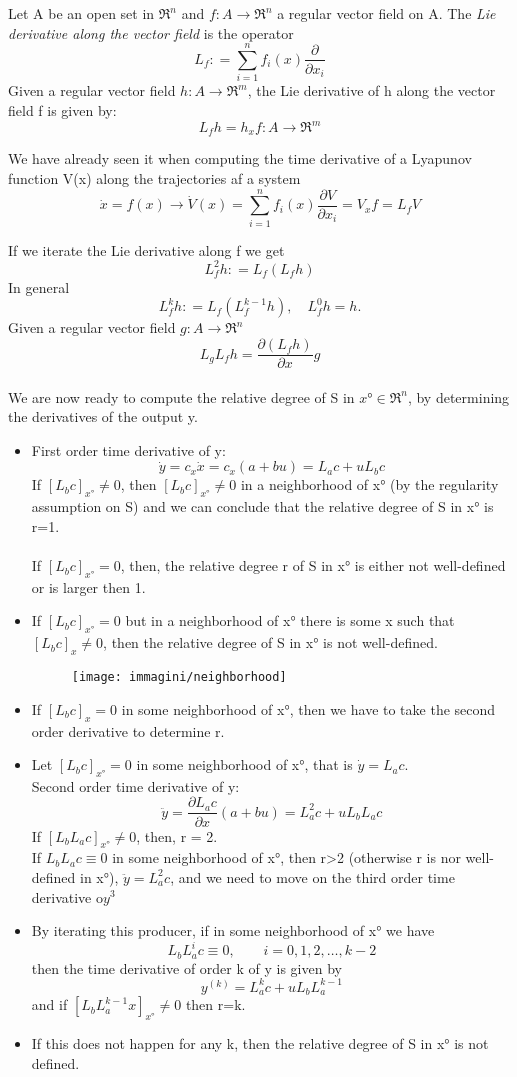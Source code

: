 \begin{defn}
	Let A be an open set in $\Re^n$ and $f\colon A \to \Re^n$ a regular vector field on A. The \emph{Lie derivative along the vector field} is the operator 
	\[
	L_f\colon=\sum_{i=1}^{n}f_i(x)\frac{\partial}{\partial x_i}
	\]
Given a regular vector field $h\colon A\to 	\Re^m$, the Lie derivative of h along the vector field f is given by: \[
\boxed{L_fh=h_xf\colon A\to \Re^m}
\]
\end{defn}
\begin{remark}
	We have already seen it when computing the time derivative of a Lyapunov function V(x) along the trajectories af a system
	\[\dot{x}=f(x)\to\dot{V}(x)=\sum_{i=1}^{n}f_i(x)\frac{\partial V}{\partial x_i}=V_xf=L_fV\]
\end{remark}
If we iterate the Lie derivative along f we get \[L_f^2h\colon=L_f(L_fh)\] In general \[L_f^kh\colon=L_f(L_f^{k-1}h),\quad L_f^0h=h.\]
Given a regular vector field $g\colon A\to \Re^n$ 
\[
L_gL_fh=\frac{\partial (L_fh)}{\partial x}g
\]
\\
We are now ready to compute the relative degree of S in $x°\in \Re^n$, by determining the derivatives of the output y.
\begin{itemize}
	\item First order time derivative of y: \[\dot{y}=c_x\dot{x}=c_x(a+bu)=L_ac+uL_bc\] If $[L_bc]_{x°}\neq 0$, then $[L_bc]_{x°}\neq 0$ in a neighborhood of x° (by the regularity assumption on S) and we can conclude that the relative degree of S in x° is r=1.\\
	\\
	If $[L_bc]_{x°}=0$, then, the relative degree r of S in x° is either not well-defined or is larger then 1.
	\item If $[L_bc]_{x°}=0$ but in a neighborhood of x° there is some x such that $[L_bc]_{x}\neq 0$, then the relative degree of S in x° is not well-defined.
	\begin{figure}[H]
		\centering
		\texttt{[image: immagini/neighborhood]}
		\label{fig:neighborhood}
	\end{figure}
	\item If $[L_bc]_x=0$ in some neighborhood of x°, then we have to take the second order derivative to determine r.
	\item Let $[L_bc]_{x°}=0$ in some neighborhood of x°, that is $\dot{y}=L_ac$.\\Second order time derivative of y: \[\ddot{y}=\frac{\partial L_ac}{\partial x}(a+bu)=L_a^2c+uL_bL_ac\]
	If $[L_bL_ac]_{x°}\neq 0$, then, r = 2.\\
	If $L_bL_ac \equiv 0 $ in some neighborhood of x°, then r>2 (otherwise r is nor well-defined in x°), $\ddot{y}=L_a^2c$, and we need to move on the third order time derivative o$y^{3}$
	\item By iterating this producer, if in some neighborhood of x° we have \[L_bL_a^ic\equiv0,\qquad i=0,1,2,\dots,k-2\] then the time derivative of order k of y is given by \[y^{(k)}=L_a^kc+uL_bL_a^{k-1}\] and if $[L_bL_a^{k-1}x]_{x°}\neq 0$ then r=k.
	\item If this does not happen for any k, then the relative degree of S in x° is not defined.
\end{itemize}

